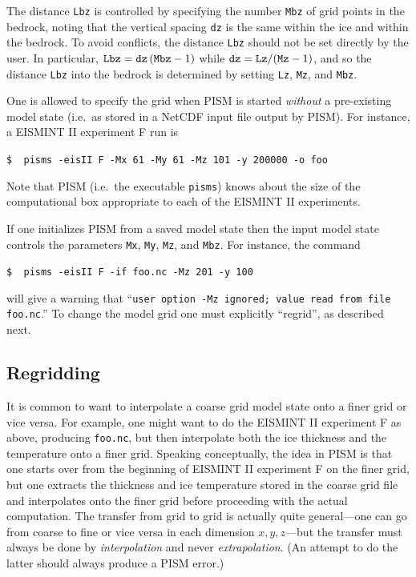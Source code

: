 \documentclass[11pt,final]{amsart}
\renewcommand{\t}[1]{\texttt{#1}}
\begin{document}
The distance \t{Lbz} is controlled by specifying the number \verb|Mbz| of grid points in the bedrock, noting that the vertical spacing \t{dz} is the same within the ice and within the bedrock.  To avoid conflicts, the distance \t{Lbz} should not be set directly by the user.  In particular, $\text{\t{Lbz}}=\text{\t{dz}}\,(\text{\t{Mbz}}-1)$ while $\text{\t{dz}} = \text{\t{Lz}} / (\text{\t{Mz}}-1)$, and so the distance \t{Lbz} into the bedrock is determined by setting \t{Lz}, \t{Mz}, and \t{Mbz}.

One is allowed to specify the grid when PISM is started \emph{without} a pre-existing model state (i.e.~as stored in a NetCDF input file output by PISM).  For instance, a EISMINT II experiment F \cite{EISMINT00} run is

\verb|$  pisms -eisII F -Mx 61 -My 61 -Mz 101 -y 200000 -o foo|

\noindent Note that PISM (i.e.~the executable \verb|pisms|) knows about the size of the computational box appropriate to each of the EISMINT II experiments.

If one initializes PISM from a saved model state then the input model state controls the parameters \t{Mx}, \t{My}, \t{Mz}, and \t{Mbz}.  For instance, the command

\verb|$  pisms -eisII F -if foo.nc -Mz 201 -y 100|

\noindent will give a warning that ``\verb|user option -Mz ignored; value read from file foo.nc|.''  To change the model grid one must explicitly ``regrid'', as described next.

\subsection{Regridding}  It is common to want to interpolate a coarse grid model state onto a finer grid or vice versa.  For example, one might want to do the EISMINT II experiment F as above, producing \verb|foo.nc|, but then interpolate both the ice thickness and the temperature onto a finer grid.  Speaking conceptually, the idea in PISM is that one starts over from the beginning of EISMINT II experiment F on the finer grid, but one extracts the thickness and ice temperature stored in the coarse grid file and interpolates onto the finer grid before proceeding with the actual computation.  The transfer from grid to grid is actually quite general---one can go from coarse to fine or vice versa in each dimension $x,y,z$---but the transfer must always be done by \emph{interpolation} and never \emph{extrapolation}.  (An attempt to do the latter should always produce a PISM error.)
\end{document}
